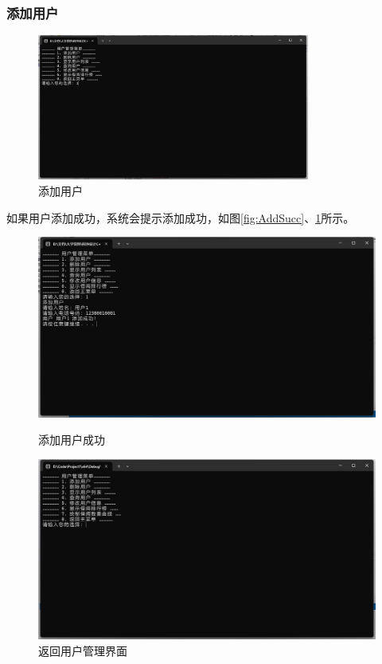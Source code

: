 \documentclass[12pt,twoside]{ctexart}
\begin{document}
\subsubsection{添加用户}
\begin{figure}[H]
    \centering
    \includegraphics[width=0.8\textwidth]{User1.png}
    \caption{添加用户}
\end{figure}

如果用户添加成功，系统会提示添加成功，如图\ref{fig:AddSucc}、\ref{fig:Addreturn}所示。

\begin{figure}[H]
    \centering
    \begin{minipage}{0.48\textwidth}
        \centering
        \includegraphics[width=\linewidth]{AddUser.png}
        \caption{添加用户成功}
        \label{fig:AddSucc}
    \end{minipage}\hfill
    \begin{minipage}{0.48\textwidth}
        \centering
        \includegraphics[width=\linewidth]{User.png}
        \caption{返回用户管理界面}
        \label{fig:Addreturn}
    \end{minipage}
\end{figure}
\end{document}
